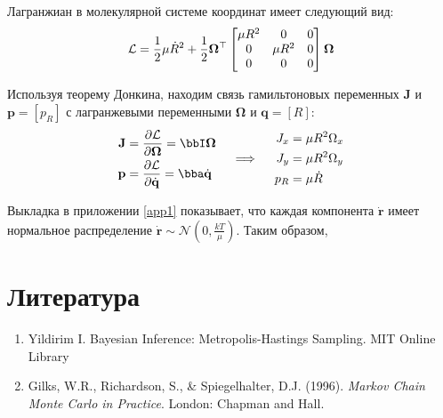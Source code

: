 \documentclass[12pt]{article}
\newcommand{\lb}{\left(}
\newcommand{\rb}{\right)}
\newcommand{\mf}{\mathbf}
\newcommand{\mL}{\mathcal{L}}
\begin{document}
Лагранжиан в молекулярной системе координат имеет следующий вид:
\begin{gather}
\mL = \frac{1}{2} \mu \dot{R}^2 + \frac{1}{2} \mf{\Omega}^\top
\begin{bmatrix}
		\mu R^2 & 0 & 0 \\
		0 & \mu R^2 & 0 \\
		0 & 0 & 0
\end{bmatrix}
\mf{\Omega} \notag
\end{gather}

Используя теорему Донкина, находим связь гамильтоновых переменных $\mf{J}$ и $\mf{p} = \left[ p_R \right]$ с лагранжевыми переменными $\mf{\Omega}$ и $\mf{q} = \left[ R \right]$:
\begin{gather}
\begin{aligned}
\mf{J} &= \frac{\partial \mL}{\partial \mf{\Omega}} = \bbI \mf{\Omega} \\
\mf{p} &= \frac{\partial \mL}{\partial \dot{\mf{q}}} = \bba \dot{\mf{q}}
\end{aligned}
\quad \implies \quad
\begin{aligned}
		J_x &= \mu R^2 \Omega_x \\
		J_y &= \mu R^2 \Omega_y \\
		p_R &= \mu \dot{R}
\end{aligned} \label{3}
\end{gather}

Выкладка в приложении \ref{app1} показывает, что каждая компонента $\dot{\mf{r}}$ имеет нормальное распределение $\dot{\mf{r}} \sim \mathcal{N} \lb 0, \displaystyle \frac{kT}{\mu} \rb$. Таким образом, 

\newpage
\section{Литература}
\begin{enumerate}
	\item Yildirim I. Bayesian Inference: Metropolis-Hastings Sampling. MIT Online Library
	\item Gilks, W.R., Richardson, S., \& Spiegelhalter, D.J. (1996). \textit{Markov Chain Monte Carlo in Practice}. London: Chapman and Hall.
\end{enumerate}

\newpage

\end{document}
